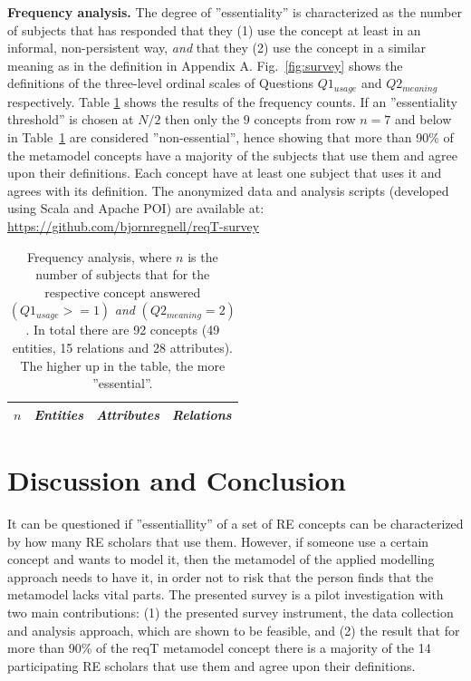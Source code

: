 \documentclass[runningheads,a4paper]{llncs}
\begin{document}
\vspace{-0.6cm}
\noindent \textbf{Frequency analysis.} The degree of ''essentiality'' is characterized as the number of subjects that has responded that they (1) use the concept at least in an informal, non-persistent way, \textit{and} that they (2) use the concept in a similar meaning as in the definition in Appendix A. Fig.~\ref{fig:survey} shows the definitions of the three-level ordinal scales of Questions $Q1_{usage}$  and $Q2_{meaning}$ respectively. Table \ref{table:frequency} shows the results of the frequency counts.  
If an ''essentiality threshold'' is chosen at $N/2$ then only the $9$ concepts from row $n = 7$ and below in Table~\ref{table:frequency} are considered ''non-essential'', hence showing that more than 90\% of the metamodel concepts have a majority of the subjects that use them and agree upon their definitions. Each concept have at least one subject that uses it and agrees with its definition. {The anonymized data and analysis scripts (developed using Scala and Apache POI) are available at: \footnotesize\url{https://github.com/bjornregnell/reqT-survey}} 
\vspace{-0.4cm}
%
\begingroup
\setlength{\tabcolsep}{4pt} %
\renewcommand{\arraystretch}{1.35} %
\begin{table}
\centering
\fontsize{7}{8}\selectfont
\caption{Frequency analysis, where $n$ is the number of subjects that for the respective concept answered $(Q1_{usage}>= 1)$ \textit{and} $(Q2_{meaning} = 2)$. In total there are 92 concepts (49 entities, 15 relations and 28 attributes). The higher up in the table, the more ''essential''.}
\label{table:frequency}
\begin{tabular}{l | p{} | p{} | p{}}
\textit{$n$} & \textit{Entities} & \textit{Attributes} & \textit{Relations} \\ \hline

 \end{tabular}
\end{table}
\endgroup





\section{Discussion and Conclusion}\label{section:discussion}

It can be questioned if ''essentiallity'' of a set of RE concepts can be characterized by how many RE scholars that use them. However, if someone use a certain concept and wants to model it, then the metamodel of the applied modelling approach needs to have it, in order not to risk that the person finds that the metamodel lacks vital parts. The presented survey is a pilot investigation with two main contributions: (1) the presented survey instrument, the data collection and analysis approach, which are shown to be feasible, and (2) the result that for more than 90\% of the reqT metamodel concept there is a majority of the 14 participating RE scholars that use them and agree upon their definitions. 
\end{document}
